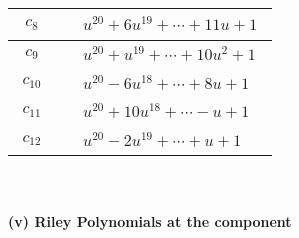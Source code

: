 \documentclass[1p]{elsarticle_modified}
\theoremstyle{definition}
\begin{document}
\begin{tabular}{m{50pt}|m{274pt}}
\hline $$\begin{aligned}c_{8}\end{aligned}$$&$\begin{aligned}
&u^{20}+6 u^{19}+\cdots+11 u+1
\end{aligned}$\\
\hline $$\begin{aligned}c_{9}\end{aligned}$$&$\begin{aligned}
&u^{20}+u^{19}+\cdots+10 u^2+1
\end{aligned}$\\
\hline $$\begin{aligned}c_{10}\end{aligned}$$&$\begin{aligned}
&u^{20}-6 u^{18}+\cdots+8 u+1
\end{aligned}$\\
\hline $$\begin{aligned}c_{11}\end{aligned}$$&$\begin{aligned}
&u^{20}+10 u^{18}+\cdots- u+1
\end{aligned}$\\
\hline $$\begin{aligned}c_{12}\end{aligned}$$&$\begin{aligned}
&u^{20}-2 u^{19}+\cdots+u+1
\end{aligned}$\\
\hline
\end{tabular}\\~\\
\newpage\renewcommand{\arraystretch}{1}
\flushleft \textbf{(v) Riley Polynomials at the component}\newline \\
\end{document}
